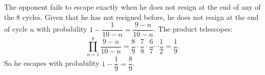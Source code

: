 The opponent fails to escape exactly when he does not resign at the end of any of the $8$ cycles. Given that he has not resigned before, he does not resign at the end of cycle $n$ with probability $1-\dfrac{1}{10-n}=\dfrac{9-n}{10-n}$. The product telescopes:
\[\prod_{n=1}^{8}\dfrac{9-n}{10-n}=\dfrac89\cdot\dfrac78\cdot\dfrac67\cdots\dfrac12=\dfrac19.\]
So he escapes with probability $1-\dfrac19=\boxed{\dfrac89}$.
